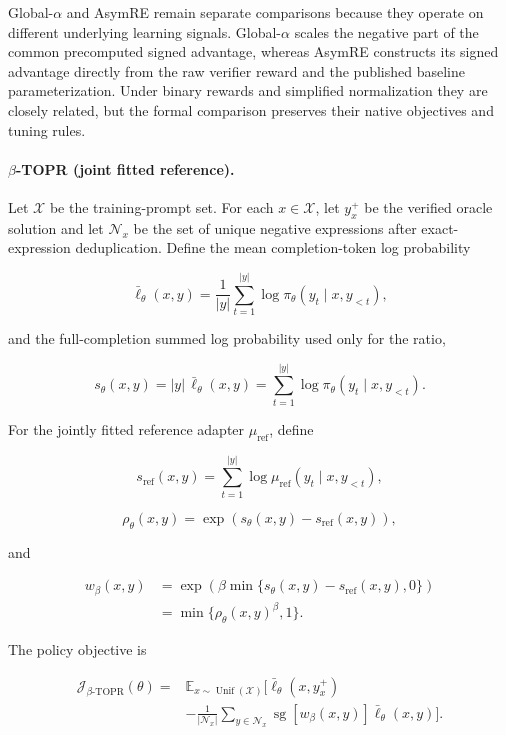\documentclass[sigconf,anonymous,review]{acmart}
\theoremstyle{acmdefinition}
\begin{document}
Global-\(\alpha\) and AsymRE remain separate comparisons because they
operate on different underlying learning signals. Global-\(\alpha\)
scales the negative part of the common precomputed signed advantage,
whereas AsymRE constructs its signed advantage directly from the raw
verifier reward and the published baseline parameterization. Under
binary rewards and simplified normalization they are closely related,
but the formal comparison preserves their native objectives and tuning
rules.

\paragraph{\(\beta\)-TOPR (joint fitted reference).}

Let \(\mathcal X\) be the training-prompt set. For each
\(x\in\mathcal X\), let \(y_x^+\) be the verified oracle solution and
let \(\mathcal N_x\) be the set of unique negative expressions after
exact-expression deduplication. Define the mean completion-token log
probability

\[
\bar{\ell}_\theta(x,y)
=
\frac{1}{|y|}
\sum_{t=1}^{|y|}
\log\pi_\theta(y_t\mid x,y_{<t}),
\]

and the full-completion summed log probability used only for the ratio,

\[
s_\theta(x,y)
=
|y|\,\bar{\ell}_\theta(x,y)
=
\sum_{t=1}^{|y|}
\log\pi_\theta(y_t\mid x,y_{<t}).
\]

For the jointly fitted reference adapter \(\mu_{\mathrm{ref}}\), define

\[
s_{\mathrm{ref}}(x,y)
=
\sum_{t=1}^{|y|}
\log\mu_{\mathrm{ref}}(y_t\mid x,y_{<t}),
\]

\[
\rho_\theta(x,y)
=
\exp\!\left(s_\theta(x,y)-s_{\mathrm{ref}}(x,y)\right),
\]

and

\[
\begin{aligned}
w_\beta(x,y)
&=
\exp\!\left(
\beta\min\{s_\theta(x,y)-s_{\mathrm{ref}}(x,y),0\}
\right) \\
&=
\min\{\rho_\theta(x,y)^\beta,1\}.
\end{aligned}
\]

The policy objective is

\[
\begin{aligned}
\mathcal J_{\beta\text{-}\mathrm{TOPR}}(\theta)
={}&
\mathbb E_{x\sim\operatorname{Unif}(\mathcal X)}
\Bigg[
\bar{\ell}_\theta(x,y_x^+) \\
&-
\frac{1}{|\mathcal N_x|}
\sum_{y\in\mathcal N_x}
\operatorname{sg}[w_\beta(x,y)]
\bar{\ell}_\theta(x,y)
\Bigg].
\end{aligned}
\]
\end{document}
